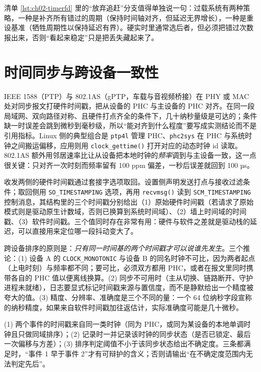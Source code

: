 \documentclass[12pt,a4paper,fontset=fandol]{ctexbook}
\newcommand{\Fn}[1]{\texttt{#1()}}
\newcommand{\Tp}[1]{\texttt{#1}}
\begin{document}
清单 \ref{lst:ch02-timerfd} 里的``放弃追赶''分支值得单独说一句：过载系统有两种策略，一种是补齐所有错过的周期（保持时间轴对齐，但延迟无界增长），一种是重设基准（牺牲周期性以保持延迟有界）。硬实时里通常选后者，但必须把错过次数报出来，否则``看起来稳定''只是把丢失藏起来了。

\section{时间同步与跨设备一致性}

\label{sec:ch02-sync}

IEEE 1588（PTP）与 802.1AS（gPTP，车载与音视频桥接）在 PHY 或 MAC 处对同步报文打硬件时间戳，把从设备的 PHC 与主设备的 PHC 对齐。在同一段局域网、双向路径对称、且硬件打点齐全的条件下，几十纳秒量级是可达的；条件缺一时误差会跳到微秒到毫秒级，所以``能对齐到什么程度''要写成实测结论而不是引用指标。Linux 侧的典型组合是 \Tp{ptp4l} 管理 PHC、\Tp{phc2sys} 在 PHC 与系统时钟之间搬运偏移，应用则用 \Fn{clock\_gettime} 打开对应的动态时钟 id 读取。802.1AS 额外用邻居速率比让从设备把本地时钟的\emph{频率}调到与主设备一致，这一点很关键：只对齐一次时刻而频率留有 100 ppm 偏差，一秒后误差就回到 100 µs。

收发两侧的硬件时间戳通过套接字选项取回。设置侧声明发送打点与接收过滤条件；取回侧用 \Tp{SO\_TIMESTAMPING} 选项，再用 \Fn{recvmsg} 读到 \Tp{SCM\_TIMESTAMPING} 控制消息，其结构里的三个时间戳分别给出（1）原始硬件时间戳（若请求了原始模式则是驱动原生计数域，否则已换算到系统时间域）、（2）墙上时间域的时间戳、（3）软件时间戳。三个值同时存在非常有用：硬件与软件之差就是驱动栈的延迟，可以直接用来定位哪一段抖动变大了。

跨设备排序的原则是：\emph{只有同一时间基的两个时间戳才可以说谁先发生}。三个推论：(1) 设备 A 的 \Tp{CLOCK\_MONOTONIC} 与设备 B 的同名时钟不可比，因为两者起点（上电时刻）与频率都不同；要可比，必须双方都用 PHC，或者在报文里同时携带各自的 PHC 值以便离线换算。(2) 同步不可用时（主从切换、链路断开、守护进程未就绪），日志要显式标记时间戳来源与置信度，而不是静默给出一个精度被夸大的值。(3) 精度、分辨率、准确度是三个不同的量：一个 64 位纳秒字段宣称的纳秒精度，如果来自软件时间戳加往返估计，实际准确度可能是几十微秒。

\begin{bestpractice}[title={跨设备事件排序的三个前置条件}]
(1) 两个事件的时间戳来自同一类时钟（同为 PHC，或同为某设备的本地单调时钟且只做同域排序）；(2) 记录时一并记录该时钟的同步状态（是否已锁定、最后一次偏移与方差）；(3) 排序判定阈值不小于该同步状态给出不确定度。三条都满足时，``事件 1 早于事件 2''才有可辩护的含义；否则请输出``在不确定度范围内无法判定先后''。
\end{bestpractice}
\end{document}
